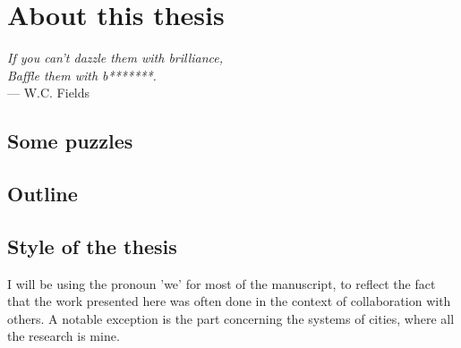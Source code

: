 

\chapter{About this thesis}
\label{chap:methodology}

\begin{flushright}{\slshape    
If you can't dazzle them with brilliance,\\
Baffle them with b*******.} \\ \medskip
--- W.C. Fields 
\end{flushright}


\section{Some puzzles}

\section{Outline}

\section{Style of the thesis}

I will be using the pronoun 'we' for most of the manuscript, to reflect the fact
that the work presented here was often done in the context of collaboration with others. A
notable exception is the part concerning the systems of cities, where all the
research is mine.
